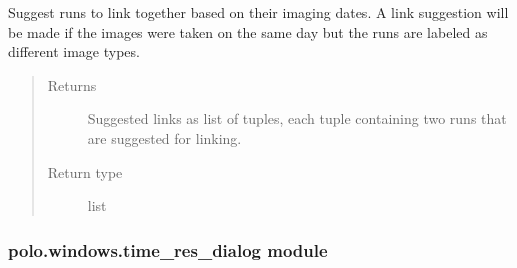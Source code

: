 \documentclass[letterpaper,10pt,english]{sphinxmanual}
\begin{document}
\begin{fulllineitems}
\begin{fulllineitems}
\end{fulllineitems}


\begin{fulllineitems}
\label{\detokenize{polo.windows:polo.windows.spectrum_dialog.SpectrumDialog.suggest_links}}
Suggest runs to link together based on their imaging dates. A link
suggestion will be made if the images were taken on the same day but the
runs are labeled as different image types.
\begin{quote}\begin{description}
\item[{Returns}] \leavevmode
Suggested links as list of tuples, each tuple containing two
runs that are suggested for linking.

\item[{Return type}] \leavevmode
list

\end{description}\end{quote}

\end{fulllineitems}


\begin{fulllineitems}
\label{\detokenize{polo.windows:polo.windows.spectrum_dialog.SpectrumDialog.validate_selection}}
\end{fulllineitems}


\end{fulllineitems}



\subsubsection{polo.windows.time\_res\_dialog module}
\label{\detokenize{polo.windows:module-polo.windows.time_res_dialog}}\label{\detokenize{polo.windows:polo-windows-time-res-dialog-module}}
\end{document}
